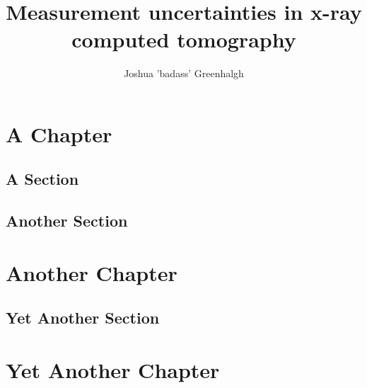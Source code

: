 \documentclass[
  twoside,
  11pt, a4paper,
  footinclude=true,
  headinclude=true,
  cleardoublepage=empty
]{scrbook}
\title{Measurement uncertainties in x-ray computed tomography}
\author{Joshua 'badass' Greenhalgh}
\begin{document}
\maketitle





\chapter{A Chapter}
\lipsum[1] %

\section{A Section}
\lipsum[1] %

\section{Another Section}
\lipsum[1] %

\chapter{Another Chapter}
\lipsum[1] %

\section{Yet Another Section}
\lipsum[1] %

\chapter{Yet Another Chapter}
\lipsum[1] %
\end{document}
